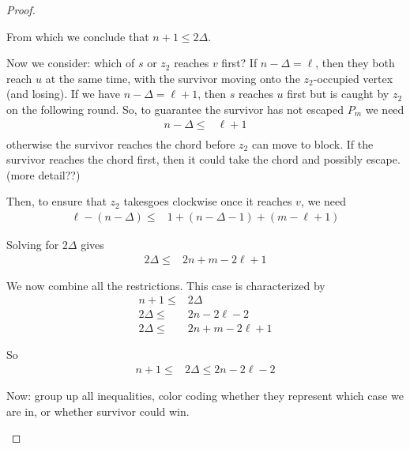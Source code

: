 \documentclass[letterpaper, 10pt]{article}
\begin{document}
\begin{proof}
\begin{proofpart}
From which we conclude that $n+1 \leq 2 \Delta$.

Now we consider: which of $s$ or $z_2$ reaches $v$ first?
If $n - \Delta = \ell$, then they both reach $u$ at the same time,
with the survivor moving onto the $z_2$-occupied vertex (and losing).
If we have $n - \Delta = \ell + 1$, then $s$ reaches $u$ first
but is caught by $z_2$ on the following round.
So, to guarantee the survivor has not escaped $P_m$ we need
\begin{align*}
  n - \Delta \leq & \ell + 1\\
\end{align*}
otherwise the survivor reaches the chord before $z_2$ can move
to block. If the survivor reaches the chord first, then it could
take the chord and possibly escape. (more detail??)

Then, to ensure that $z_2$ takesgoes clockwise once
it reaches $v$, we need
\begin{align*}
  \ell - (n - \Delta) \leq & 1 + (n - \Delta - 1) + (m - \ell + 1)
\end{align*}

Solving for $2\Delta$ gives
\begin{align*}
  2 \Delta \leq & 2n + m - 2\ell + 1
\end{align*}

We now combine all the restrictions. This case is characterized by
\begin{align*}
  n + 1 \leq & 2 \Delta \\
  2 \Delta \leq & 2n - 2 \ell -2 \\
  2 \Delta \leq & 2n + m - 2\ell +1
\end{align*}

So
\begin{align*}
  n + 1 \leq & 2 \Delta \leq 2n - 2\ell -2
\end{align*}

Now: group up all inequalities, color coding whether they represent
which case we are in, or whether survivor could win.


\end{proofpart}



\end{proof}
\end{document}
